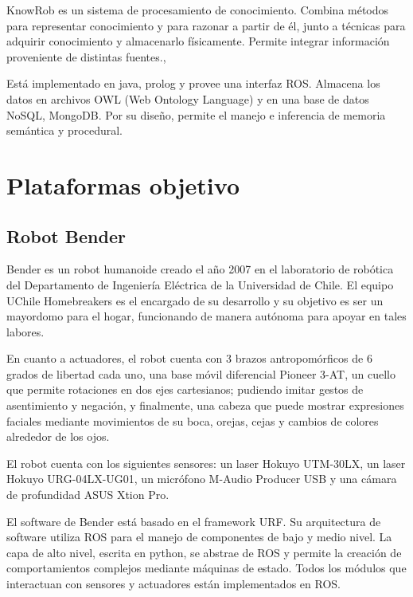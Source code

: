 KnowRob es un sistema de procesamiento de conocimiento. Combina m\'etodos para representar conocimiento y para razonar a partir de \'el, junto a t\'ecnicas  para adquirir conocimiento y almacenarlo f\'isicamente. Permite integrar informaci\'on proveniente de distintas fuentes.\cite{Tenorth2013}, \cite{Tenorth2009}

Est\'a implementado en java, prolog y provee una interfaz ROS. Almacena los datos en archivos OWL (Web Ontology Language) y en una base de datos NoSQL, MongoDB. Por su dise\~no, permite el manejo e inferencia de memoria sem\'antica y procedural.





\section{Plataformas objetivo}

\subsection{Robot Bender}

Bender es un robot humanoide creado el a\~no 2007 en el laboratorio de rob\'otica del Departamento de Ingenier\'ia El\'ectrica de la Universidad de Chile. El equipo UChile Homebreakers es el encargado de su desarrollo y  su objetivo es ser un mayordomo para el hogar, funcionando de manera aut\'onoma para apoyar en tales labores\cite{uchile-robotics}.


En cuanto a actuadores, el robot cuenta con 3 brazos antropom\'orficos de 6 grados de libertad cada uno, una base m\'ovil diferencial Pioneer 3-AT, un cuello que permite rotaciones en dos ejes cartesianos; pudiendo imitar gestos de asentimiento y negaci\'on, y finalmente, una cabeza que puede mostrar expresiones faciales mediante movimientos de su boca, orejas, cejas y cambios de colores alrededor de los ojos.

El robot cuenta con los siguientes sensores: un laser Hokuyo UTM-30LX, un laser Hokuyo URG-04LX-UG01, un micr\'ofono M-Audio Producer USB y una c\'amara de profundidad ASUS Xtion Pro.

El software de Bender est\'a basado en el framework URF. Su arquitectura de software utiliza  ROS para el manejo de componentes de bajo y medio nivel. La capa de alto nivel, escrita en python, se abstrae de ROS y permite la creaci\'on de comportamientos complejos mediante m\'aquinas de estado. Todos los m\'odulos que interactuan con sensores y actuadores est\'an implementados en ROS.


%





